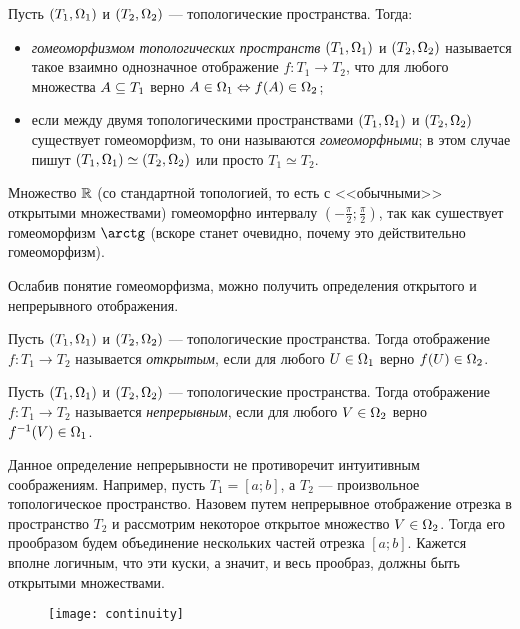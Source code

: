 \documentclass[main]{subfiles}
\begin{document}
\begin{definition}
	Пусть $ (T_1, \Omega_1) $ и $ (T_2, \Omega_2) $ --- топологические пространства. Тогда:
	\begin{itemize}
		\item \emph{гомеоморфизмом топологических пространств} $ (T_1, \Omega_1) $ и $ (T_2, \Omega_2) $ называется такое
			взаимно однозначное отображение $ f \colon T_1 \to T_2 $, что для любого множества $ A \subseteq T_1 $ верно
			$ A \in \Omega_1 \Leftrightarrow f(A) \in \Omega_2 $;
		\item если между двумя топологическими пространствами $ (T_1, \Omega_1) $ и $ (T_2, \Omega_2) $ существует
			гомеоморфизм, то они называются \emph{гомеоморфными}; в этом случае пишут
			$ (T_1, \Omega_1 ) \simeq (T_2, \Omega_2) $ или просто $ T_1 \simeq T_2 $.
	\end{itemize}
\end{definition}

\begin{example}
	Множество $ \mathbb{R} $ (со стандартной топологией, то есть с <<обычными>> открытыми множествами) гомеоморфно
	интервалу $ \left( -\frac{\pi}{2}; \frac{\pi}{2} \right) $, так как сушествует гомеоморфизм $ \arctg $
	(вскоре станет очевидно, почему это действительно гомеоморфизм).
\end{example}

Ослабив понятие гомеоморфизма, можно получить определения открытого и непрерывного отображения.

\begin{definition}
	Пусть $ (T_1, \Omega_1) $ и $ (T_2, \Omega_2) $ --- топологические пространства. Тогда отображение
	$ f \colon T_1 \to T_2 $ называется \emph{открытым}, если для любого $ U \in \Omega_1 $ верно $ f(U) \in \Omega_2 $.
\end{definition}

\begin{definition}
	Пусть $ (T_1, \Omega_1) $ и $ (T_2, \Omega_2) $ --- топологические пространства. Тогда отображение
	$ f \colon T_1 \to T_2 $ называется \emph{непрерывным}, если для любого $ V \in \Omega_2 $ верно
	$ f^{-1}(V) \in \Omega_1 $.
\end{definition}

\begin{remark}
	Данное определение непрерывности не противоречит интуитивным соображениям. Например,
	пусть $ T_1 = [a; b] $, а $ T_2 $ --- произвольное топологическое пространство. Назовем путем непрерывное
	отображение отрезка в пространство $ T_2 $ и рассмотрим некоторое открытое множество $ V \in \Omega_2 $. Тогда его
	прообразом будем объединение нескольких частей отрезка $ [a; b] $. Кажется вполне логичным, что эти куски,
	а значит, и весь прообраз, должны быть открытыми множествами.

	\begin{figure}[H]
		\centering \texttt{[image: continuity]}
	\end{figure}
\end{remark}
\end{document}
